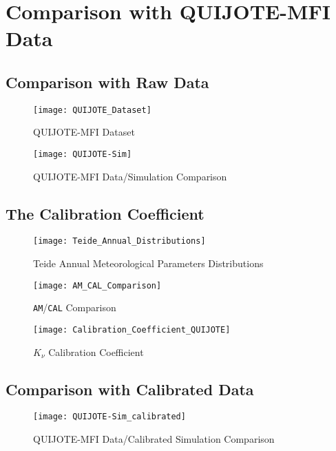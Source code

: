 \chapter{Comparison with QUIJOTE-MFI Data}\label{ch:comparison_quijote}

\section{Comparison with Raw Data}

\begin{figure}
        \centering
        \texttt{[image: QUIJOTE\_Dataset]}
        \caption{QUIJOTE-MFI Dataset}
        \label{fig:quijote_dataset}
\end{figure}

\begin{figure}
        \centering
        \texttt{[image: QUIJOTE-Sim]}
        \caption{QUIJOTE-MFI Data/Simulation Comparison}
        \label{fig:quijote_sim}
\end{figure}

\section{The Calibration Coefficient}

\begin{figure}
        \centering
        \texttt{[image: Teide\_Annual\_Distributions]}
        \caption{Teide Annual Meteorological Parameters Distributions}
        \label{fig:teide_annual_distributions}
\end{figure}

\begin{figure}
        \centering
        \texttt{[image: AM\_CAL\_Comparison]}
        \caption{\texttt{AM}/\texttt{CAL} Comparison}
        \label{fig:am_cal_comparison}
\end{figure}

\begin{figure}
        \centering
        \texttt{[image: Calibration\_Coefficient\_QUIJOTE]}
        \caption{$K_\nu$ Calibration Coefficient}
        \label{fig:calibration_coefficient_quijote}
\end{figure}

\section{Comparison with Calibrated Data}

\begin{figure}
        \centering
        \texttt{[image: QUIJOTE-Sim\_calibrated]}
        \caption{QUIJOTE-MFI Data/Calibrated Simulation Comparison}
        \label{fig:quijote_sim_calibrated}
\end{figure}

